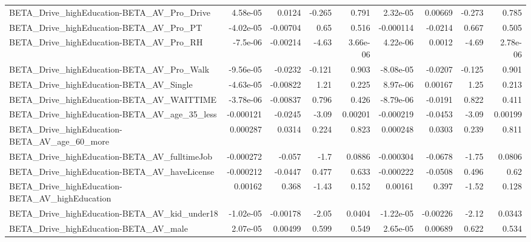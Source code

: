 \begin{tabular}{lrrrrrrrr}
BETA\_Drive\_highEducation-BETA\_AV\_Pro\_Drive         &    4.58e-05 &       0.0124 &    -0.265 &    0.791 &   2.32e-05 &     0.00669 &       -0.273 &         0.785 \\
BETA\_Drive\_highEducation-BETA\_AV\_Pro\_PT            &   -4.02e-05 &     -0.00704 &      0.65 &    0.516 &  -0.000114 &     -0.0214 &        0.667 &         0.505 \\
BETA\_Drive\_highEducation-BETA\_AV\_Pro\_RH            &    -7.5e-06 &     -0.00214 &     -4.63 & 3.66e-06 &   4.22e-06 &      0.0012 &        -4.69 &      2.78e-06 \\
BETA\_Drive\_highEducation-BETA\_AV\_Pro\_Walk          &   -9.56e-05 &      -0.0232 &    -0.121 &    0.903 &  -8.08e-05 &     -0.0207 &       -0.125 &         0.901 \\
BETA\_Drive\_highEducation-BETA\_AV\_Single            &   -4.63e-05 &     -0.00822 &      1.21 &    0.225 &   8.97e-06 &     0.00167 &         1.25 &         0.213 \\
BETA\_Drive\_highEducation-BETA\_AV\_WAITTIME          &   -3.78e-06 &     -0.00837 &     0.796 &    0.426 &  -8.79e-06 &     -0.0191 &        0.822 &         0.411 \\
BETA\_Drive\_highEducation-BETA\_AV\_age\_35\_less       &   -0.000121 &      -0.0245 &     -3.09 &  0.00201 &  -0.000219 &     -0.0453 &        -3.09 &       0.00199 \\
BETA\_Drive\_highEducation-BETA\_AV\_age\_60\_more       &    0.000287 &       0.0314 &     0.224 &    0.823 &   0.000248 &      0.0303 &        0.239 &         0.811 \\
BETA\_Drive\_highEducation-BETA\_AV\_fulltimeJob       &   -0.000272 &       -0.057 &      -1.7 &   0.0886 &  -0.000304 &     -0.0678 &        -1.75 &        0.0806 \\
BETA\_Drive\_highEducation-BETA\_AV\_haveLicense       &   -0.000212 &      -0.0447 &     0.477 &    0.633 &  -0.000222 &     -0.0508 &        0.496 &          0.62 \\
BETA\_Drive\_highEducation-BETA\_AV\_highEducation     &     0.00162 &        0.368 &     -1.43 &    0.152 &    0.00161 &       0.397 &        -1.52 &         0.128 \\
BETA\_Drive\_highEducation-BETA\_AV\_kid\_under18       &   -1.02e-05 &     -0.00178 &     -2.05 &   0.0404 &  -1.22e-05 &    -0.00226 &        -2.12 &        0.0343 \\
BETA\_Drive\_highEducation-BETA\_AV\_male              &    2.07e-05 &      0.00499 &     0.599 &    0.549 &   2.65e-05 &     0.00689 &        0.622 &         0.534 \\

\end{tabular}
